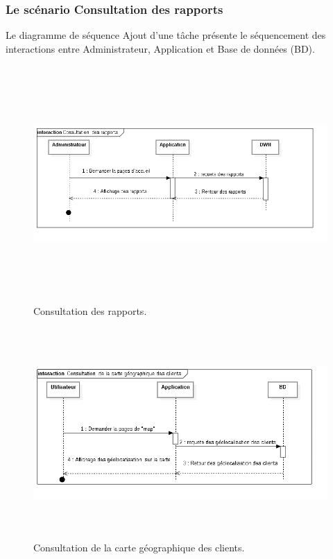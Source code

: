 




\newpage

\subsubsection{Le sc\'{e}nario \guillemotleft{} Consultation des rapports\guillemotright{}}
Le diagramme de s\'{e}quence \guillemotleft{} Ajout d'une t\^{a}che \guillemotright{} pr\'{e}sente le s\'{e}quencement
des interactions entre Administrateur, Application et Base de donn\'{e}es (BD).


\begin{figure}[H]
\center
\includegraphics[width=14cm,height=9cm]{./figures/seq/G.png}
\caption{Consultation des rapports.}
\end{figure}



\begin{figure}[H]
\center
\includegraphics[width=14cm,height=8cm]{./figures/seq/H.png}
\caption{Consultation de la carte g\'{e}ographique des clients.}
\end{figure}
\newpage

